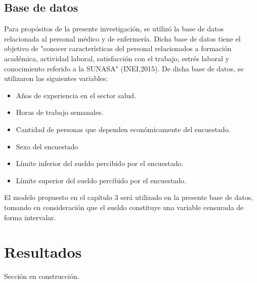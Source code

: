 \subsection{Base de datos}
Para propósitos de la presente investigación, se utilizó la base de datos relacionada al personal médico y de enfermería. Dicha base de datos tiene el objetivo de "conocer características del personal relacionados a formación académica, actividad laboral, satisfacción con el trabajo, estrés laboral y conocimiento referido a la SUNASA" (INEI,2015). De dicha base de datos, se utilizaron las siguientes variables:
\begin{itemize}
	\item Años de experiencia en el sector salud.
	\item Horas de trabajo semanales.
	\item Cantidad de personas que dependen económicamente del encuestado.
	\item Sexo del encuestado
	\item Límite inferior del sueldo percibido por el encuestado.
	\item Límite superior del sueldo percibido por el encuestado.
\end{itemize}

El modelo propuesto en el capítulo 3 será utilizado en la presente base de datos, tomando en consideración que el sueldo constituye una variable censurada de forma intervalar. 

\section{Resultados}

Sección en construcción.
